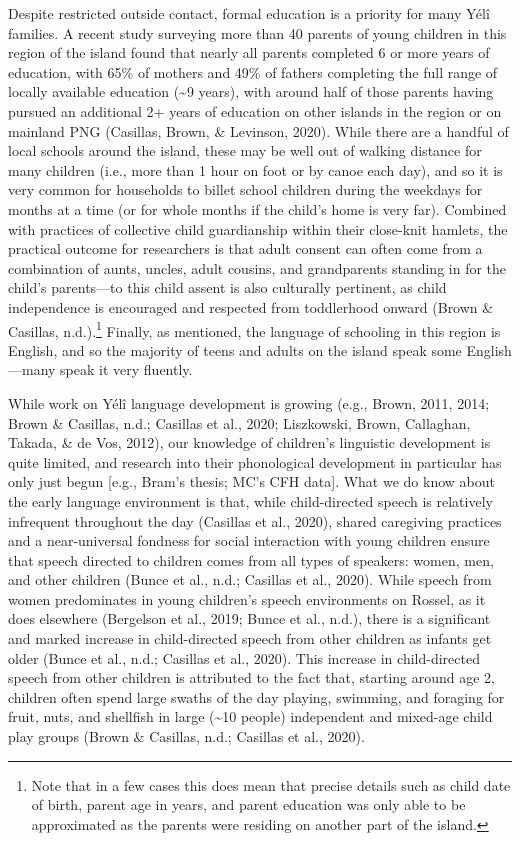 \documentclass[english,,man,floatsintext]{apa6}
\begin{document}
Despite restricted outside contact, formal education is a priority for many Yélî families. A recent study surveying more than 40 parents of young children in this region of the island found that nearly all parents completed 6 or more years of education, with 65\% of mothers and 49\% of fathers completing the full range of locally available education (\textasciitilde{}9 years), with around half of those parents having pursued an additional 2+ years of education on other islands in the region or on mainland PNG (Casillas, Brown, \& Levinson, 2020). While there are a handful of local schools around the island, these may be well out of walking distance for many children (i.e., more than 1 hour on foot or by canoe each day), and so it is very common for households to billet school children during the weekdays for months at a time (or for whole months if the child's home is very far). Combined with practices of collective child guardianship within their close-knit hamlets, the practical outcome for researchers is that adult consent can often come from a combination of aunts, uncles, adult cousins, and grandparents standing in for the child's parents---to this child assent is also culturally pertinent, as child independence is encouraged and respected from toddlerhood onward (Brown \& Casillas, n.d.).\footnote{Note that in a few cases this does mean that precise details such as child date of birth, parent age in years, and parent education was only able to be approximated as the parents were residing on another part of the island.} Finally, as mentioned, the language of schooling in this region is English, and so the majority of teens and adults on the island speak some English---many speak it very fluently.

While work on Yélî language development is growing (e.g., Brown, 2011, 2014; Brown \& Casillas, n.d.; Casillas et al., 2020; Liszkowski, Brown, Callaghan, Takada, \& de Vos, 2012), our knowledge of children's linguistic development is quite limited, and research into their phonological development in particular has only just begun {[}e.g., Bram's thesis; MC's CFH data{]}. What we do know about the early language environment is that, while child-directed speech is relatively infrequent throughout the day (Casillas et al., 2020), shared caregiving practices and a near-universal fondness for social interaction with young children ensure that speech directed to children comes from all types of speakers: women, men, and other children (Bunce et al., n.d.; Casillas et al., 2020). While speech from women predominates in young children's speech environments on Rossel, as it does elsewhere (Bergelson et al., 2019; Bunce et al., n.d.), there is a significant and marked increase in child-directed speech from other children as infants get older (Bunce et al., n.d.; Casillas et al., 2020). This increase in child-directed speech from other children is attributed to the fact that, starting around age 2, children often spend large swaths of the day playing, swimming, and foraging for fruit, nuts, and shellfish in large (\textasciitilde{}10 people) independent and mixed-age child play groups (Brown \& Casillas, n.d.; Casillas et al., 2020).
\end{document}
